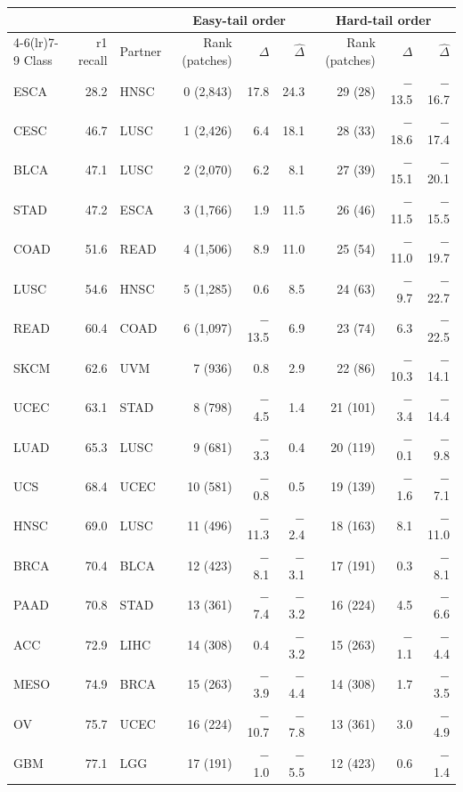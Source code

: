 \begin{table}[htbp]
\centering
\small
\setlength{\tabcolsep}{4pt}
\renewcommand{\arraystretch}{1.08}
\begin{tabular}{@{}lrlrrrrrr@{}}
\toprule
 & & & \multicolumn{3}{c}{Easy-tail order} & \multicolumn{3}{c}{Hard-tail order} \\
\cmidrule(lr){4-6}\cmidrule(lr){7-9}
Class & r1 recall & Partner & Rank (patches) & $\Delta$ & $\hat\Delta$ & Rank (patches) & $\Delta$ & $\hat\Delta$ \\
\midrule
ESCA & 28.2 & HNSC & 0 (2,843) & 17.8 & 24.3 & 29 (28) & $-$13.5 & $-$16.7 \\
CESC & 46.7 & LUSC & 1 (2,426) & 6.4 & 18.1 & 28 (33) & $-$18.6 & $-$17.4 \\
BLCA & 47.1 & LUSC & 2 (2,070) & 6.2 & 8.1 & 27 (39) & $-$15.1 & $-$20.1 \\
STAD & 47.2 & ESCA & 3 (1,766) & 1.9 & 11.5 & 26 (46) & $-$11.5 & $-$15.5 \\
COAD & 51.6 & READ & 4 (1,506) & 8.9 & 11.0 & 25 (54) & $-$11.0 & $-$19.7 \\
LUSC & 54.6 & HNSC & 5 (1,285) & 0.6 & 8.5 & 24 (63) & $-$9.7 & $-$22.7 \\
READ & 60.4 & COAD & 6 (1,097) & $-$13.5 & 6.9 & 23 (74) & 6.3 & $-$22.5 \\
SKCM & 62.6 & UVM & 7 (936) & 0.8 & 2.9 & 22 (86) & $-$10.3 & $-$14.1 \\
UCEC & 63.1 & STAD & 8 (798) & $-$4.5 & 1.4 & 21 (101) & $-$3.4 & $-$14.4 \\
LUAD & 65.3 & LUSC & 9 (681) & $-$3.3 & 0.4 & 20 (119) & $-$0.1 & $-$9.8 \\
\addlinespace
UCS & 68.4 & UCEC & 10 (581) & $-$0.8 & 0.5 & 19 (139) & $-$1.6 & $-$7.1 \\
HNSC & 69.0 & LUSC & 11 (496) & $-$11.3 & $-$2.4 & 18 (163) & 8.1 & $-$11.0 \\
BRCA & 70.4 & BLCA & 12 (423) & $-$8.1 & $-$3.1 & 17 (191) & 0.3 & $-$8.1 \\
PAAD & 70.8 & STAD & 13 (361) & $-$7.4 & $-$3.2 & 16 (224) & 4.5 & $-$6.6 \\
ACC & 72.9 & LIHC & 14 (308) & 0.4 & $-$3.2 & 15 (263) & $-$1.1 & $-$4.4 \\
MESO & 74.9 & BRCA & 15 (263) & $-$3.9 & $-$4.4 & 14 (308) & 1.7 & $-$3.5 \\
OV & 75.7 & UCEC & 16 (224) & $-$10.7 & $-$7.8 & 13 (361) & 3.0 & $-$4.9 \\
GBM & 77.1 & LGG & 17 (191) & $-$1.0 & $-$5.5 & 12 (423) & 0.6 & $-$1.4 \\

\end{tabular}
\end{table}
